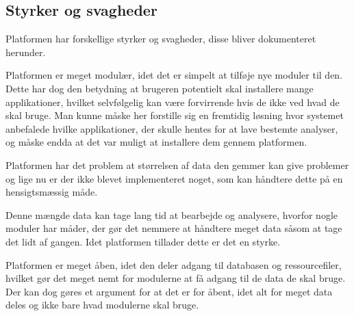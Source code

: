 \subsection{Styrker og svagheder}
Platformen har forskellige styrker og svagheder, disse bliver dokumenteret herunder. 

Platformen er meget modulær, idet det er simpelt at tilføje nye moduler til den. %
Dette har dog den betydning at brugeren potentielt skal installere mange applikationer, hvilket selvfølgelig kan være forvirrende hvis de ikke ved hvad de skal bruge. %
Man kunne måske her forstille sig en fremtidig løsning hvor systemet anbefalede hvilke applikationer, der skulle hentes for at lave bestemte analyser, og måske endda at det var muligt at installere dem gennem platformen.

Platformen har det problem at størrelsen af data den gemmer kan give problemer og lige nu er der ikke blevet implementeret noget, som kan håndtere dette på en hensigtsmæssig måde. %

Denne mængde data kan tage lang tid at bearbejde og analysere, hvorfor nogle moduler har måder, der gør det nemmere at håndtere meget data såsom at tage det lidt af gangen.
Idet platformen tillader dette er det en styrke. %

Platformen er meget åben, idet den deler adgang til databasen og ressourcefiler, hvilket gør det meget nemt for modulerne at få adgang til de data de skal bruge. 
Der kan dog gøres et argument for at det er for åbent, idet alt for meget data deles og ikke bare hvad modulerne skal bruge. 

